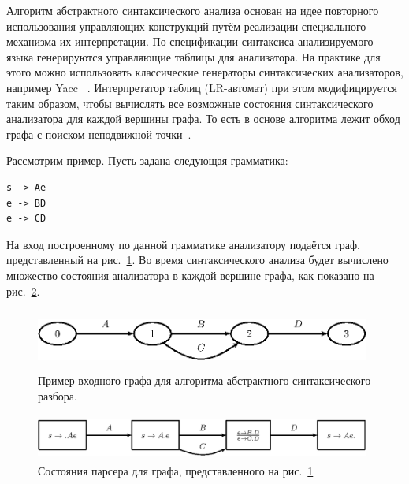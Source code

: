 \documentclass{llncs}
\begin{document}
Алгоритм абстрактного синтаксического анализа основан на идее повторного использования управляющих конструкций путём реализации специального механизма их интерпретации. По спецификации синтаксиса анализируемого языка генерируются управляющие таблицы для анализатора. На практике для этого можно использовать классические генераторы синтаксических анализаторов, например Yacc ~\cite{Yacc}. Интерпретатор таблиц (LR-автомат) при этом модифицируется таким образом, чтобы вычислять все возможные состояния синтаксического анализатора для каждой вершины графа. То есть в основе алгоритма лежит обход графа с поиском неподвижной точки~\cite{ALVOR2}.

Рассмотрим пример. Пусть задана следующая грамматика:

\begin{verbatim}
s -> Ae
e -> BD
e -> CD
\end{verbatim}

На вход построенному по данной грамматике анализатору подаётся граф, представленный на рис.~\ref{pic2}. Во время синтаксического анализа будет вычислено множество состояния анализатора в каждой вершине графа, как показано на рис.~\ref{pic3}.

\begin{figure}
    \begin{center}
        \includegraphics[width=11cm,height=2cm]{graphs/simple_grammar_inpt.eps}
        \caption{Пример входного графа для алгоритма абстрактного синтаксического разбора.}
        \label{pic2}
    \end{center}
\end{figure}

\begin{figure}
    \begin{center}
        \includegraphics[width=11cm,height=1.5cm]{graphs/simple_grammar_items.eps}
        \caption{Состояния парсера для графа, представленного на рис.~\ref{pic2}}
        \label{pic3}
    \end{center}
\end{figure}
\end{document}
